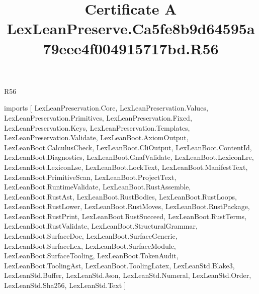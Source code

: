 \begin{lexlean}{R56}
\title{Certificate A LexLeanPreserve.Ca5fe8b9d64595a79eee4f004915717bd.R56}
\begin{coremodule}
imports [
  LexLeanPreservation.Core,
  LexLeanPreservation.Values,
  LexLeanPreservation.Primitives,
  LexLeanPreservation.Fixed,
  LexLeanPreservation.Keys,
  LexLeanPreservation.Templates,
  LexLeanPreservation.Validate,
  LexLeanBoot.AxiomOutput,
  LexLeanBoot.CalculusCheck,
  LexLeanBoot.CliOutput,
  LexLeanBoot.ContentId,
  LexLeanBoot.Diagnostics,
  LexLeanBoot.GnafValidate,
  LexLeanBoot.LexiconLre,
  LexLeanBoot.LexiconLse,
  LexLeanBoot.LockText,
  LexLeanBoot.ManifestText,
  LexLeanBoot.PrimitiveScan,
  LexLeanBoot.ProjectText,
  LexLeanBoot.RuntimeValidate,
  LexLeanBoot.RustAssemble,
  LexLeanBoot.RustAst,
  LexLeanBoot.RustBodies,
  LexLeanBoot.RustLoops,
  LexLeanBoot.RustLower,
  LexLeanBoot.RustMoves,
  LexLeanBoot.RustPackage,
  LexLeanBoot.RustPrint,
  LexLeanBoot.RustSucceed,
  LexLeanBoot.RustTerms,
  LexLeanBoot.RustValidate,
  LexLeanBoot.StructuralGrammar,
  LexLeanBoot.SurfaceDoc,
  LexLeanBoot.SurfaceGeneric,
  LexLeanBoot.SurfaceLex,
  LexLeanBoot.SurfaceModule,
  LexLeanBoot.SurfaceTooling,
  LexLeanBoot.TokenAudit,
  LexLeanBoot.ToolingAst,
  LexLeanBoot.ToolingLatex,
  LexLeanStd.Blake3,
  LexLeanStd.Buffer,
  LexLeanStd.Json,
  LexLeanStd.Numeral,
  LexLeanStd.Order,
  LexLeanStd.Sha256,
  LexLeanStd.Text
]


\end{coremodule}
\end{lexlean}
